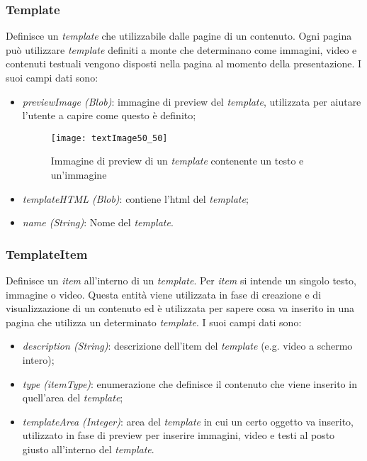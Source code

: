 \subsubsection{Template}
Definisce un \textit{template} che utilizzabile dalle pagine di un contenuto. Ogni pagina può utilizzare \textit{template} definiti a monte che determinano come immagini, video e contenuti testuali vengono disposti nella pagina al momento della presentazione. I suoi campi dati sono:
\begin{itemize}
    \item \textit{previewImage (Blob)}: immagine di preview del \textit{template}, utilizzata per aiutare l'utente a capire come questo è definito;
    \begin{figure}[h]
        \begin{center}
        \texttt{[image: textImage50\_50]}
        \caption{Immagine di preview di un \textit{template} contenente un testo e un'immagine}
        \label{fig:figure15}
        \end{center}
    \end{figure}
    \item \textit{templateHTML (Blob)}: contiene l'html del \textit{template};
    \item \textit{name (String)}: Nome del \textit{template}.
\end{itemize}

\subsubsection{TemplateItem}
Definisce un \textit{item} all'interno di un \textit{template}. Per \textit{item} si intende un singolo testo, immagine o video. Questa entità viene utilizzata in fase di creazione e di visualizzazione di un contenuto ed è utilizzata per sapere cosa va inserito in una pagina che utilizza un determinato \textit{template}. 
I suoi campi dati sono:
\begin{itemize}
    \item \textit{description (String)}: descrizione dell'item del \textit{template} (e.g. video a schermo intero);
    \item \textit{type (itemType)}: enumerazione che definisce il contenuto che viene inserito in quell’area del \textit{template};
    \item \textit{templateArea (Integer)}: area del \textit{template} in cui un certo oggetto va inserito, utilizzato in fase di preview per inserire immagini, video e testi al posto giusto all'interno del \textit{template}.
\end{itemize}

